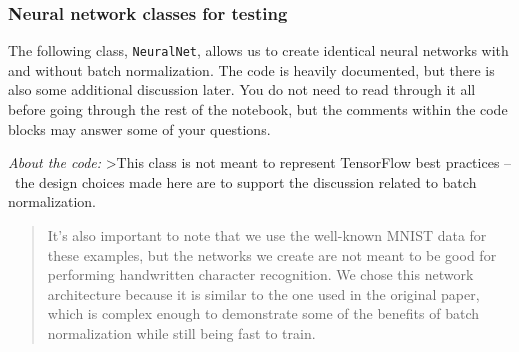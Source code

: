 \documentclass[11pt]{article}
\begin{document}
    \hypertarget{neural-network-classes-for-testing}{%
\subsubsection{Neural network classes for
testing}\label{neural-network-classes-for-testing}}

The following class, \texttt{NeuralNet}, allows us to create identical
neural networks with and without batch normalization. The code is
heavily documented, but there is also some additional discussion later.
You do not need to read through it all before going through the rest of
the notebook, but the comments within the code blocks may answer some of
your questions.

\emph{About the code:} \textgreater{}This class is not meant to
represent TensorFlow best practices --~the design choices made here are
to support the discussion related to batch normalization.

\begin{quote}
It's also important to note that we use the well-known MNIST data for
these examples, but the networks we create are not meant to be good for
performing handwritten character recognition. We chose this network
architecture because it is similar to the one used in the original
paper, which is complex enough to demonstrate some of the benefits of
batch normalization while still being fast to train.
\end{quote}
\end{document}
